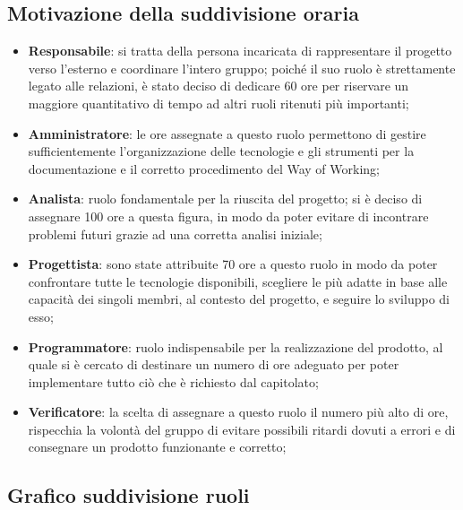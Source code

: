 \documentclass[a4paper,10pt]{article}
\begin{document}
\subsection*{Motivazione della suddivisione oraria}
\begin{itemize}
    \item \textbf{Responsabile}: si tratta della persona incaricata di rappresentare il progetto verso l’esterno e coordinare l’intero gruppo; poiché il suo ruolo è strettamente legato alle relazioni, è stato deciso di dedicare 60 ore per riservare un maggiore quantitativo di tempo ad altri ruoli ritenuti più importanti;
    \item \textbf{Amministratore}: le ore assegnate a questo ruolo permettono di gestire sufficientemente l'organizzazione delle tecnologie e gli strumenti per la documentazione e il corretto procedimento del Way of Working;
    \item \textbf{Analista}: ruolo fondamentale per la riuscita del progetto; si è deciso di assegnare 100 ore a questa figura, in modo da poter evitare di incontrare problemi futuri grazie ad una corretta analisi iniziale;
    \item \textbf{Progettista}: sono state attribuite 70 ore a questo ruolo in modo da poter confrontare tutte le tecnologie disponibili, scegliere le più adatte in base alle capacità dei singoli membri, al contesto del progetto, e seguire lo sviluppo di esso;
    \item \textbf{Programmatore}: ruolo indispensabile per la realizzazione del prodotto, al quale si è cercato di destinare un numero di ore adeguato per poter implementare tutto ciò che è richiesto dal capitolato;
    \item \textbf{Verificatore}: la scelta di assegnare a questo ruolo il numero più alto di ore, rispecchia la volontà del gruppo di evitare possibili ritardi dovuti a errori e di consegnare un prodotto funzionante e corretto;
\end{itemize}

\subsection*{Grafico suddivisione ruoli}

\vspace{1\baselineskip}
\vspace{1\baselineskip}

\begin{center}
\end{center}
\end{document}
